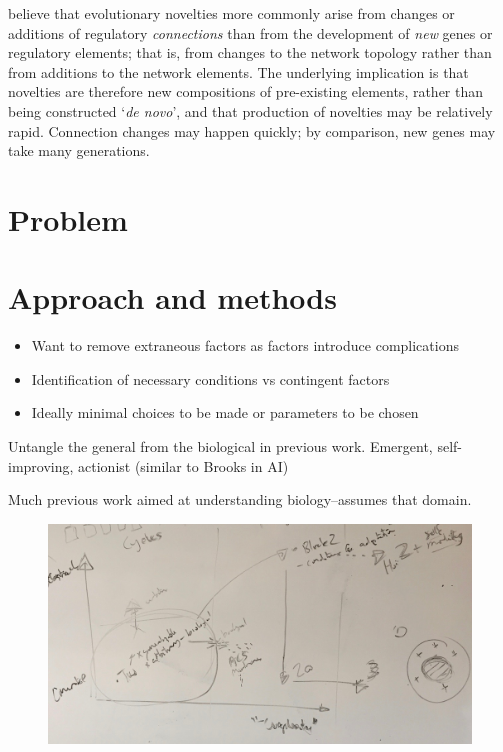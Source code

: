 \autocite{Prudhomme:2007ax} believe that evolutionary novelties more
commonly arise from changes or additions of regulatory
\emph{connections} than from the development of \emph{new} genes or
regulatory elements; that is, from changes to the network topology
rather than from additions to the network elements. The underlying
implication is that novelties are therefore new compositions of
pre-existing elements, rather than being constructed `\emph{de novo}',
and that production of novelties may be relatively rapid. Connection
changes may happen quickly; by comparison, new genes may take many generations.

\section{Problem}



\section{Approach and methods}\label{approach}

\begin{itemize}
	\item
	      Want to remove extraneous factors as factors introduce complications
	\item
	      Identification of necessary conditions vs contingent factors
	\item
	      Ideally minimal choices to be made or parameters to be chosen
\end{itemize}

Untangle the general from the biological in previous work. Emergent, self-improving, actionist (similar to Brooks in AI)

Much previous work aimed at understanding biology--assumes that domain.

\begin{figure}
	\begin{center}
		\includegraphics[width=\linewidth]{figures/approach}
	\end{center}
\end{figure}

